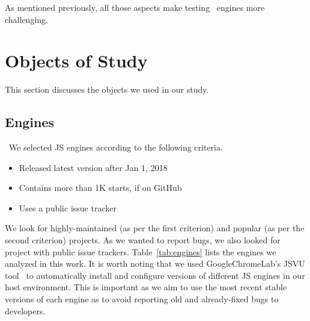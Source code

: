 \documentclass[10pt,conference,anonymous]{IEEEtran}
\begin{document}
As mentioned previously, all those aspects make testing \js\ engines
more challenging.






\section{Objects of Study}
\label{sec:methodology}

This section discusses the objects we used in our study.

\subsection{Engines}
\label{sec:methodology:engines}~We selected 
JS engines according to the following criteria.

\begin{itemize}
\item Released latest version after Jan 1, 2018
\item Contains more than 1K starts, if on GitHub  
\item Uses a public issue tracker
\end{itemize}  

We look for highly-maintained (as per the first criterion) and popular
(as per the second criterion) projects. As we wanted to report bugs,
we also looked for project with public issue
trackers. Table~\ref{tab:engines} lists the engines we analyzed in
this work. It is worth noting that we used GoogleChromeLab's JSVU
tool~\cite{jsvu} to automatically install and configure versions of
different JS engines in our host environment. This is important as we
aim to use the most recent stable versions of each engine as to avoid
reporting old and already-fixed bugs to developers.
\end{document}
